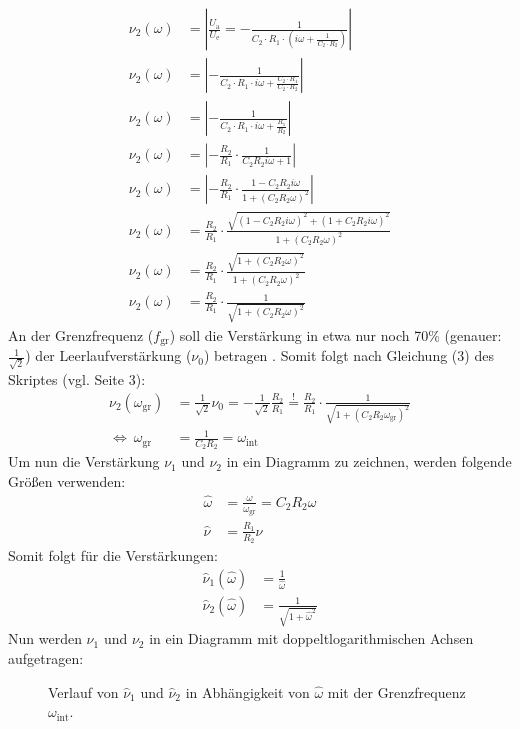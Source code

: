 \begin{align}
    \nu_2(\omega)&=\left|\frac{U_\text{a}}{U_\text{e}}=-\frac{1}{C_2\cdot R_1\cdot\left(i\omega+\frac{1}{C_2\cdot R_2}\right)}\right|\\
    \nu_2(\omega)&=\left|-\frac{1}{C_2\cdot R_1\cdot i\omega+\frac{C_2\cdot R_1}{C_2\cdot R_2}}\right|\\
    \nu_2(\omega)&=\left|-\frac{1}{C_2\cdot R_1\cdot i\omega+\frac{R_1}{R_2}}\right|\\
    \nu_2(\omega)&=\left|-\frac{R_2}{R_1}\cdot\frac{1}{C_2R_2i\omega+1}\right|\\
    \nu_2(\omega)&=\left|-\frac{R_2}{R_1}\cdot\frac{1-C_2R_2i\omega}{1+\left(C_2R_2\omega\right)^2}\right|\\
    \nu_2(\omega)&=\frac{R_2}{R_1}\cdot\frac{\sqrt{\left(1-C_2R_2i\omega\right)^2+\left(1+C_2R_2i\omega\right)^2}}{1+\left(C_2R_2\omega\right)^2}\\
    \nu_2(\omega)&=\frac{R_2}{R_1}\cdot\frac{\sqrt{1+\left(C_2R_2\omega\right)^2}}{1+\left(C_2R_2\omega\right)^2}\\
    \nu_2(\omega)&=\frac{R_2}{R_1}\cdot\frac{1}{\sqrt{1+\left(C_2R_2\omega\right)^2}}
\end{align}\newpage
An der Grenzfrequenz ($f_\text{gr}$) soll die Verstärkung in etwa nur noch 70\% (genauer: $\frac{1}{\sqrt{2}}$) der Leerlaufverstärkung ($\nu_0$) betragen \citep[vgl.][S.264]{EKS}.
Somit folgt nach Gleichung (3) des Skriptes (vgl. Seite 3):
\begin{align}
    \nu_2(\omega_\text{gr})&=\frac{1}{\sqrt{2}}\nu_0=-\frac{1}{\sqrt{2}}\frac{R_2}{R_1}\overset{!}{=}\frac{R_2}{R_1}\cdot\frac{1}{\sqrt{1+\left(C_2R_2\omega_\text{gr}\right)^2}}\\
    \Leftrightarrow\:\omega_\text{gr}&=\frac{1}{C_2R_2}=\omega_{\text{int}}
\end{align}
Um nun die Verstärkung $\nu_1$ und $\nu_2$ in ein Diagramm zu zeichnen, werden folgende Größen verwenden:
\begin{align}
    \hat{\omega}&=\frac{\omega}{\omega_\text{gr}}=C_2R_2\omega\\
    \hat{\nu}&=\frac{R_1}{R_2}\nu
\end{align}
Somit folgt für die Verstärkungen:
\begin{align}
    \hat{\nu}_1\left(\hat{\omega}\right)&=\frac{1}{\hat{\omega}}\\
    \hat{\nu}_2\left(\hat{\omega}\right)&=\frac{1}{\sqrt{1+\hat{\omega}^2}}
\end{align}
Nun werden $\nu_1$ und $\nu_2$ in ein Diagramm mit doppeltlogarithmischen Achsen aufgetragen:
\begin{figure}[h]
    \centering\scalebox{0.85}{}
    \caption{Verlauf von $\hat{\nu}_1$ und $\hat{\nu}_2$ in Abhängigkeit von $\hat{\omega}$ mit der Grenzfrequenz $\omega_\text{int}$.}
\end{figure}
\newpage
